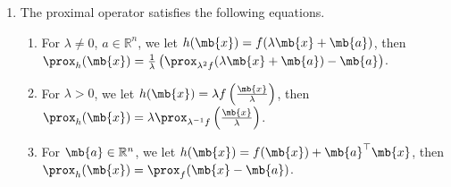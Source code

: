 \begin{exercise}
\begin{enumerate}
        \item The proximal operator satisfies the following equations.
            \begin{enumerate}
                \item For $\lambda\not=0$, $a\in\mathbb{R}^n$, we let $h(\mb{x})=f(\lambda \mb{x}+\mb{a})$, then $ \prox_{h}(\mb{x})=\frac{1}{\lambda}\left(\prox_{\lambda^{2} f}(\lambda \mb{x}+\mb{a})-\mb{a}\right)$.
                \item For $\lambda>0$, we let $h(\mb{x})=\lambda f\left(\frac{\mb{x}}{\lambda}\right)$, then $ \prox_{h}(\mb{x})=\lambda \prox_{\lambda^{-1} f}\left(\frac{\mb{x}}{\lambda}\right)$.
                \item For $\mb{a}\in\mathbb{R}^n$, we let $h(\mb{x})=f(\mb{x})+\mb{a}^\top \mb{x}$, then $ \prox_{h}(\mb{x})=\prox_{f}(\mb{x}-\mb{a})$.
            \end{enumerate}


\end{enumerate}
\end{exercise}
